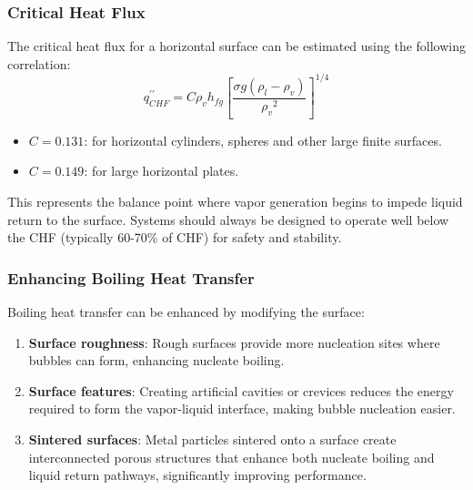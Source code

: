 \subsubsection*{Critical Heat Flux}
\begin{definition}
%   
The critical heat flux for a horizontal surface can be estimated using the following correlation:
\[
    q_{CHF}^{\prime \prime}=C \rho_v h_{f g}\left[\frac{\sigma g\left(\rho_l-\rho_v\right)}{\rho_v{ }^2}\right]^{1 / 4}
\]
\begin{itemize}
    \item $C=0.131$: for horizontal cylinders, spheres and other large finite surfaces.
    \item $C=0.149$: for large horizontal plates.
\end{itemize}
\end{definition}

This represents the balance point where vapor generation begins to impede liquid return to the surface. Systems should always be designed to operate well below the CHF (typically 60-70\% of CHF) for safety and stability.
\subsubsection*{Enhancing Boiling Heat Transfer}
Boiling heat transfer can be enhanced by modifying the surface:

\begin{enumerate}
    \item \textbf{Surface roughness}: Rough surfaces provide more nucleation sites where bubbles can form, enhancing nucleate boiling.

    \item \textbf{Surface features}: Creating artificial cavities or crevices reduces the energy required to form the vapor-liquid interface, making bubble nucleation easier.

    \item \textbf{Sintered surfaces}: Metal particles sintered onto a surface create interconnected porous structures that enhance both nucleate boiling and liquid return pathways, significantly improving performance.
\end{enumerate}

